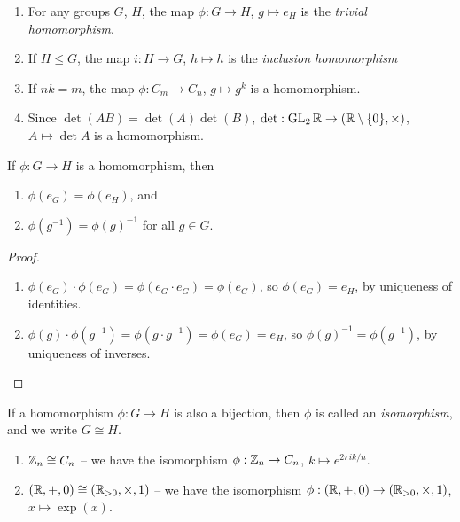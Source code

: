 \documentclass{../template/note}
\begin{document}
    \begin{example*}
        \begin{enumerate}[label=\protect\circled{\arabic*}]
            \item For any groups \(G\), \(H\), the map \(\phi: G \to H\), \(g \mapsto e_H\) is the \emph{trivial homomorphism}.
            \item If \(H \leq G\), the map \(i: H \to G\), \(h \mapsto h\) is the \emph{inclusion homomorphism}
            \item If \(nk = m\), the map \(\phi: C_m \to C_n\), \(g \mapsto g^k\) is a homomorphism.
            \item Since \(\det(AB) = \det(A) \det(B)\), \(\det: \operatorname{GL}_2 \mathbb R \to (\mathbb R \setminus \{0\}, \times)\), \(A \mapsto \det A\) is a homomorphism.
        \end{enumerate}
    \end{example*}
    
    \begin{lemma}
        If \(\phi: G \to H\) is a homomorphism, then
        \begin{enumerate}
            \item \(\phi(e_G) = \phi(e_H)\), and
            \item \(\phi(g^{-1}) = \phi(g)^{-1}\) for all \(g \in G\).
        \end{enumerate}
        \label{homomorphism-identity-inverse}   
    \end{lemma}
    
    \begin{proof}
        \begin{enumerate}
            \item \(\phi(e_G) \cdot \phi(e_G) = \phi(e_G \cdot e_G) = \phi(e_G)\), so \(\phi(e_G) = e_H\), by uniqueness of identities.
            \item \(\phi(g) \cdot \phi(g^{-1}) = \phi(g \cdot g^{-1}) = \phi(e_G) = e_H\), so \(\phi(g)^{-1} = \phi(g^{-1})\), by uniqueness of inverses.
        \end{enumerate}        
    \end{proof}
    
    \begin{definition}[Isomorphisms]
        If a homomorphism \(\phi: G \to H\) is also a bijection, then \(\phi\) is called an \emph{isomorphism}, and we write \(G \cong H\).
    \end{definition}
    
    \begin{example*}
        \begin{enumerate}
            \item \(\mathbb Z_n \cong C_n\) -- we have the isomorphism \(\phi: \mathbb Z_n \to C_n\), \(k \mapsto e^{2\pi i k /n}\).
            \item \((\mathbb R, +, 0) \cong (\mathbb R_{> 0}, \times, 1)\) -- we have the isomorphism \(\phi: (\mathbb R, +, 0) \to (\mathbb R_{> 0}, \times, 1)\), \(x \mapsto \exp(x)\).
        \end{enumerate}
    \end{example*}
    
\end{document}
